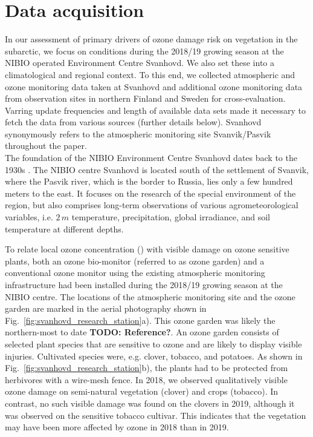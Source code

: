 \documentclass[bg, manuscript]{copernicus}
\begin{document}
\section{Data acquisition}
\label{sec:data}

In our assessment of primary drivers of ozone damage risk on vegetation in the subarctic, we focus on conditions during the 2018/19 growing season at the NIBIO operated Environment Centre Svanhovd. We also set these into a climatological and regional context. To this end, we collected atmospheric and ozone monitoring data taken at Svanhovd and additional ozone monitoring data from observation sites in northern Finland and Sweden for cross-evaluation. Varring update frequencies and length of available data sets made it necessary to fetch the data from various sources (further details below). Svanhovd synonymously refers to the atmospheric monitoring site Svanvik/Pasvik throughout the paper.\\

The foundation of the NIBIO Environment Centre Svanhovd dates back to the 1930s \citep{NIBIO_Svanhovd}. The NIBIO centre Svanhovd is located south of the settlement of Svanvik, where the Pasvik river, which is the border to Russia, lies only a few hundred meters to the east. It focuses on the research of the special environment of the region, but also comprises long-term observations of various agrometeorological variables, i.e. $2\,\unit{m}$ temperature, precipitation, global irradiance, and soil temperature at different depths.

To relate local ozone concentration (\chem{[O_3]}) with visible damage on ozone sensitive plants, both an ozone bio-monitor (referred to as ozone garden) and a conventional ozone monitor using the existing atmospheric monitoring infrastructure had been installed during the 2018/19 growing season at the NIBIO centre. The locations of the atmospheric monitoring site and the ozone garden are marked in the aerial photography shown in Fig.~\ref{fig:svanhovd_research_station}a). This ozone garden was likely the northern-most to date {\bf TODO: Reference?}. An ozone garden consists of selected plant species that are sensitive to ozone and are likely to display visible injuries. Cultivated species were, e.g. clover, tobacco, and potatoes. As shown in Fig.~\ref{fig:svanhovd_research_station}b), the plants had to be protected from herbivores with a wire-mesh fence. In 2018, we observed qualitatively visible ozone damage on semi-natural vegetation (clover) and crops (tobacco). In contrast, no such visible damage was found on the clovers in 2019, although it was observed on the sensitive tobacco cultivar. This indicates that the vegetation may have been more affected by ozone in 2018 than in 2019.
\end{document}
